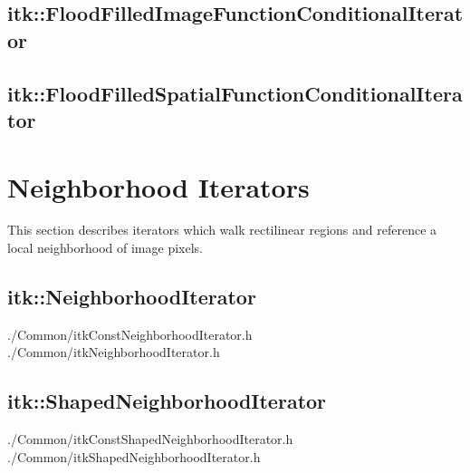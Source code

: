 \subsection{itk::FloodFilledImageFunctionConditionalIterator}
\label{itk::FloodFilledImageFunctionConditionalIterator}


\subsection{itk::FloodFilledSpatialFunctionConditionalIterator}
\label{itk::FloodFilledSpatialFunctionConditionalIterator}


\section{Neighborhood Iterators}
\label{sec:NeighborhoodIterators}
This section describes iterators which walk rectilinear regions and reference a
local neighborhood of image pixels.




\subsection{itk::NeighborhoodIterator}
\label{sec:itkNeighborhoodIterator}
./Common/itkConstNeighborhoodIterator.h
./Common/itkNeighborhoodIterator.h

\subsection{itk::ShapedNeighborhoodIterator}
\label{sec:itkShapedNeighborhoodIterator}
./Common/itkConstShapedNeighborhoodIterator.h
./Common/itkShapedNeighborhoodIterator.h



